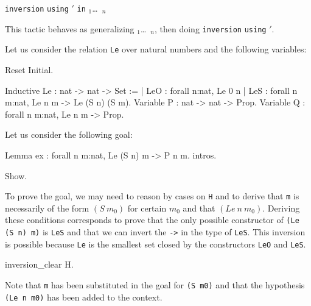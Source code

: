 \begin{coq_example*}
\begin{Variants}
\item {} \texttt{inversion}
  {\ident} \texttt{using} \ident$'$ \texttt{in} \ident$_1$\dots\ \ident$_n$

  This tactic behaves as generalizing \ident$_1$\dots\ \ident$_n$,
  then doing \texttt{inversion} {\ident} \texttt{using} \ident$'$.

\end{Variants}

\firstexample
{}
\label{inversion-examples}

Let us consider the relation \texttt{Le} over natural numbers and the
following variables:

\begin{coq_eval}
Reset Initial.
\end{coq_eval}

\begin{coq_example*}
Inductive Le : nat -> nat -> Set :=
  | LeO : forall n:nat, Le 0 n
  | LeS : forall n m:nat, Le n m -> Le (S n) (S m).
Variable P : nat -> nat -> Prop.
Variable Q : forall n m:nat, Le n m -> Prop.
\end{coq_example*}

Let us consider the following goal:

\begin{coq_eval}
Lemma ex : forall n m:nat, Le (S n) m -> P n m.
intros.
\end{coq_eval}

\begin{coq_example}
Show.
\end{coq_example}

To prove the goal, we may need to reason by cases on \texttt{H} and to
derive that \texttt{m} is necessarily of
the form $(S~m_0)$ for certain $m_0$ and that $(Le~n~m_0)$.
Deriving these conditions corresponds to prove that the
only possible constructor of \texttt{(Le (S n) m)} is
\texttt{LeS} and that we can invert the
\texttt{->} in the type  of \texttt{LeS}.
This inversion is possible because \texttt{Le} is the smallest set closed by
the constructors \texttt{LeO} and \texttt{LeS}.

\begin{coq_example}
inversion_clear H.
\end{coq_example}

Note that \texttt{m} has been substituted in the goal for \texttt{(S m0)}
and that the hypothesis \texttt{(Le n m0)} has been added to the
context.


\end{coq_example*}
